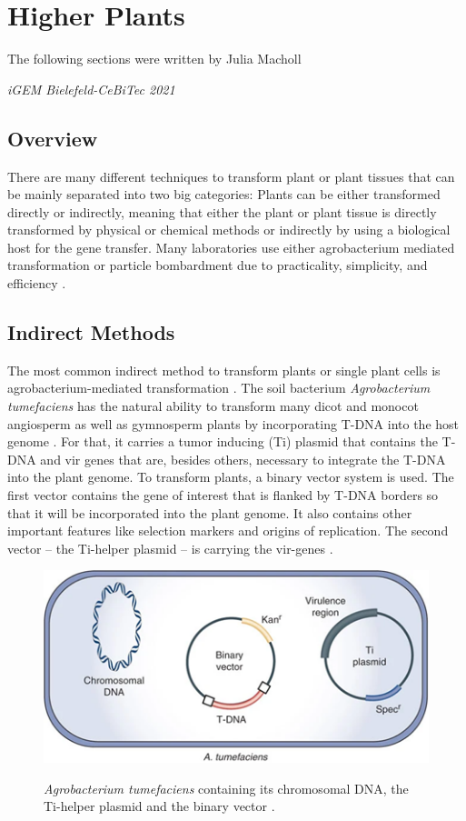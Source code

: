 \section{Higher Plants}
\epigraph{The following sections were written by Julia Macholl}{\textit{iGEM Bielefeld-CeBiTec 2021}}
\subsection{Overview}
There are many different techniques to transform plant or plant tissues that can be mainly separated into two big categories: Plants can be either transformed directly or indirectly, meaning that either the plant or plant tissue is directly transformed by physical or chemical methods or indirectly by using a biological host for the gene transfer. Many laboratories use either agrobacterium mediated transformation or particle bombardment due to practicality, simplicity, and efficiency \parencite{Keshavareddy2018}. 


\subsection{Indirect Methods}
The most common indirect method to transform plants or single plant cells is agrobacterium-mediated transformation \parencite{Hwang2017}. The soil bacterium \textit{Agrobacterium tumefaciens} has the natural ability to transform many dicot and monocot angiosperm as well as gymnosperm plants by incorporating T-DNA into the host genome \parencite{Gelwin2003}. For that, it carries a tumor inducing (Ti) plasmid that contains the T-DNA and vir genes that are, besides others, necessary to integrate the T-DNA into the plant genome. To transform plants, a binary vector system is used. The first vector contains the gene of interest that is flanked by T-DNA borders so that it will be incorporated into the plant genome. It also contains other important features like selection markers and origins of replication. The second vector – the Ti-helper plasmid – is carrying the vir-genes \parencite{Lee2008}.
\\

\begin{figure}[!htbp]
    \centering
    \includegraphics[width=\textwidth]{images/chap3/higher plants/image1.png}
    \label{fig:ch3high01}
    \caption{\textit{Agrobacterium tumefaciens} containing its chromosomal DNA, the Ti-helper plasmid and the binary vector \parencite{Michielse2008}.} 
\end{figure}
\FloatBarrier

